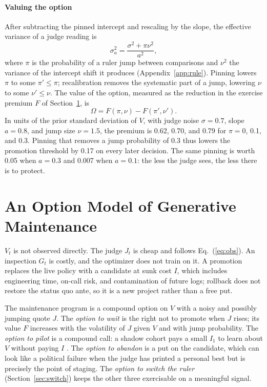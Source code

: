 \documentclass[acmsmall,screen,review]{acmart}
\theoremstyle{acmdefinition}
\begin{document}
\paragraph{Valuing the option} After subtracting the pinned intercept and rescaling by the slope, the effective variance of a judge reading is
\begin{equation}\label{eq:sigma}
\sigma_a^2 = \frac{\sigma^2 + \pi\nu^2}{a^2},
\end{equation}
where $\pi$ is the probability of a ruler jump between comparisons and $\nu^2$ the variance of the intercept shift it produces (Appendix~\ref{app:rule}). Pinning lowers $\pi$ to some $\pi' \le \pi$; recalibration removes the systematic part of a jump, lowering $\nu$ to some $\nu' \le \nu$. The value of the option, measured as the reduction in the exercise premium $F$ of Section~\ref{sec:model}, is
\begin{equation}\label{eq:omega}
\Omega = F(\pi,\nu) - F(\pi',\nu').
\end{equation}
In units of the prior standard deviation of $V$, with judge noise $\sigma = 0.7$, slope $a = 0.8$, and jump size $\nu = 1.5$, the premium is 0.62, 0.70, and 0.79 for $\pi = 0$, 0.1, and 0.3. Pinning that removes a jump probability of 0.3 thus lowers the promotion threshold by 0.17 on every later decision. The same pinning is worth 0.05 when $a = 0.3$ and 0.007 when $a = 0.1$: the less the judge sees, the less there is to protect.

\section{An Option Model of Generative Maintenance}\label{sec:model}

$V_t$ is not observed directly. The judge $J_t$ is cheap and follows Eq.~(\ref{eq:obs}). An inspection $G_t$ is costly, and the optimizer does not train on it. A promotion replaces the live policy with a candidate at sunk cost $I$, which includes engineering time, on-call risk, and contamination of future logs; rollback does not restore the status quo ante, so it is a new project rather than a free put.

The maintenance program is a compound option on $V$ with a noisy and possibly jumping quote $J$. The \emph{option to wait} is the right not to promote when $J$ rises; its value $F$ increases with the volatility of $J$ given $V$ and with jump probability. The \emph{option to pilot} is a compound call: a shadow cohort pays a small $I_1$ to learn about $V$ without paying $I$ \citep{tewari2026}. The \emph{option to abandon} is a put on the candidate, which can look like a political failure when the judge has printed a personal best but is precisely the point of staging. The \emph{option to switch the ruler} (Section~\ref{sec:switch}) keeps the other three exercisable on a meaningful signal.
\end{document}

